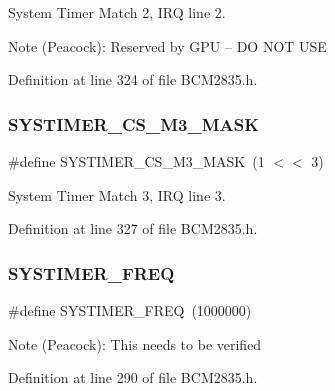System Timer Match 2, I\+RQ line 2. 

\begin{DoxyNote}{Note}
(Peacock)\+: Reserved by G\+PU -- DO N\+OT U\+SE 
\end{DoxyNote}


Definition at line 324 of file B\+C\+M2835.\+h.

\mbox{\label{group__SYSTIMER_gaa925270b7e407cdf21f76e3bc5aee07f}} 
\subsubsection{\texorpdfstring{S\+Y\+S\+T\+I\+M\+E\+R\+\_\+\+C\+S\+\_\+\+M3\+\_\+\+M\+A\+SK}{SYSTIMER\_CS\_M3\_MASK}}
{\footnotesize\ttfamily \#define S\+Y\+S\+T\+I\+M\+E\+R\+\_\+\+C\+S\+\_\+\+M3\+\_\+\+M\+A\+SK~(1 $<$$<$ 3)}



System Timer Match 3, I\+RQ line 3. 



Definition at line 327 of file B\+C\+M2835.\+h.

\mbox{\label{group__SYSTIMER_gafeebbd2589412bdf2a7adc37273c8701}} 
\subsubsection{\texorpdfstring{S\+Y\+S\+T\+I\+M\+E\+R\+\_\+\+F\+R\+EQ}{SYSTIMER\_FREQ}}
{\footnotesize\ttfamily \#define S\+Y\+S\+T\+I\+M\+E\+R\+\_\+\+F\+R\+EQ~(1000000)}

\begin{DoxyNote}{Note}
(Peacock)\+: This needs to be verified 
\end{DoxyNote}


Definition at line 290 of file B\+C\+M2835.\+h.

